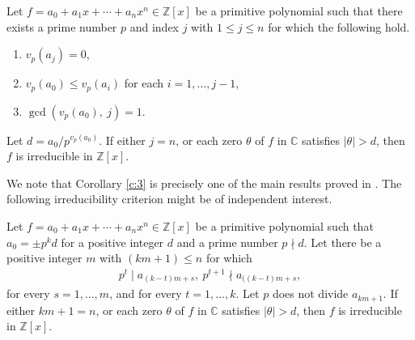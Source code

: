 \documentclass[12pt]{amsart}%
\begin{document}
\begin{corollary}\label{c:3}
Let $f=a_0 + a_1x + \cdots + a_nx^n \in \mathbb{Z}[x]$ be a primitive polynomial such that  there exists a prime number $p$ and index $j$ with $1\leq j\leq n$ for which the following hold.
\begin{enumerate}[label=$(\roman*)$]
\item $v_p(a_j)=0$,
\item $v_p(a_0)\leq v_p(a_i)$ for each $i=1,\ldots,j-1$,
\item $\gcd(v_p(a_0),~j) = 1$.
\end{enumerate}
Let $d=a_0/p^{v_p(a_0)}$. If either $j=n$, or each zero $\theta$ of $f$ in ${\mathbb{C}}$ satisfies $|\theta|>d$, then   $f$ is irreducible in $\mathbb{Z}[x]$.
\end{corollary}
We note that Corollary \ref{c:3} is precisely one of the main results proved in \cite{J-S-3}.
The following irreducibility criterion might be of independent interest.
\begin{corollary}\label{c:4}
Let $f=a_0 + a_1x + \cdots + a_nx^n \in \mathbb{Z}[x]$ be a primitive polynomial such that $a_0=\pm p^k d$ for a positive integer $d$ and a prime number $p\nmid d$. Let there be a  positive integer $m$ with $(km+1)\leq n$ for which
\begin{eqnarray*}
p^t\mid a_{(k-t) m+s},~p^{t+1}\nmid a_{((k-t) m+s},
\end{eqnarray*}
for every $s=1, \hdots, m$, and for every $t=1,\hdots,k$. Let $p$ does not divide $a_{km+1}$.
If either $km+1=n$, or each zero $\theta$ of $f$ in ${\mathbb{C}}$ satisfies $|\theta|>d$, then  $f$ is irreducible in $\mathbb{Z}[x]$.
\end{corollary}
\end{document}
